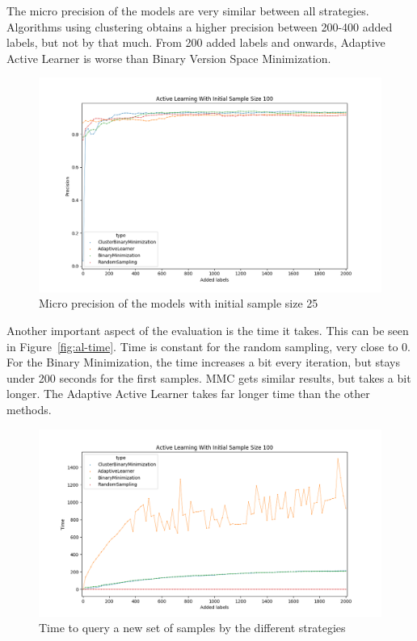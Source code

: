 The micro precision of the models are very similar between all strategies.
Algorithms using clustering obtains a higher precision between 200-400 added labels, but not by that much.
From 200 added labels and onwards, Adaptive Active Learner is worse than Binary Version Space Minimization.

\begin{figure}
    \centering
    \includegraphics[scale=0.5]{figures/al-100-micro-precision.png}
    \caption{Micro precision of the models with initial sample size 25}
    \label{fig:al-micro-precision-25}
\end{figure}

Another important aspect of the evaluation is the time it takes.
This can be seen in Figure~\ref{fig:al-time}.
Time is constant for the random sampling, very close to 0.
For the Binary Minimization, the time increases a bit every iteration, but stays under 200 seconds for the first samples.
MMC gets similar results, but takes a bit longer.
The Adaptive Active Learner takes far longer time than the other methods.

\begin{figure}
    \centering
    \includegraphics[scale=0.5]{figures/al-time.png}
    \caption{Time to query a new set of samples by the different strategies}
    \label{fig:al-micro-precision-25}
\end{figure}


